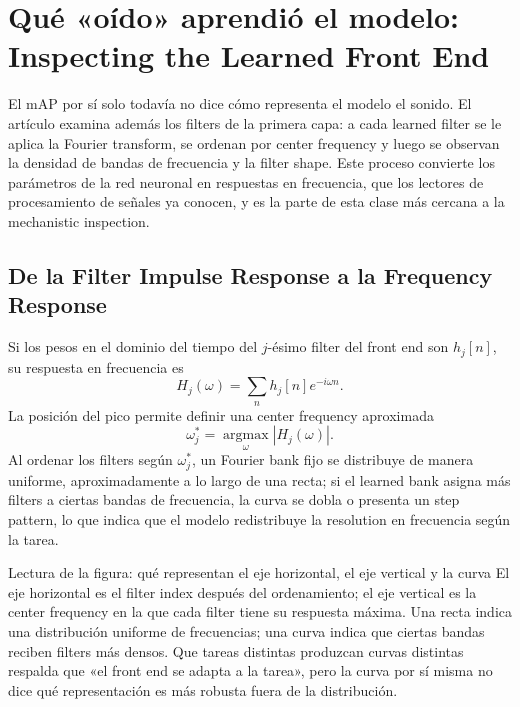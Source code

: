 \section{Qué «oído» aprendió el modelo: Inspecting the Learned Front End}

El mAP por sí solo todavía no dice cómo representa el modelo el sonido. El artículo examina además los filters de la primera capa: a cada learned filter se le aplica la Fourier transform, se ordenan por center frequency y luego se observan la densidad de bandas de frecuencia y la filter shape. Este proceso convierte los parámetros de la red neuronal en respuestas en frecuencia, que los lectores de procesamiento de señales ya conocen, y es la parte de esta clase más cercana a la mechanistic inspection.

\subsection{De la Filter Impulse Response a la Frequency Response}

Si los pesos en el dominio del tiempo del $j$-ésimo filter del front end son $h_j[n]$, su respuesta en frecuencia es
\[
H_j(\omega)=\sum_n h_j[n]e^{-i\omega n}.
\]
La posición del pico permite definir una center frequency aproximada
\[
\omega_j^*=\operatorname*{argmax}_{\omega}|H_j(\omega)|.
\]
Al ordenar los filters según $\omega_j^*$, un Fourier bank fijo se distribuye de manera uniforme, aproximadamente a lo largo de una recta; si el learned bank asigna más filters a ciertas bandas de frecuencia, la curva se dobla o presenta un step pattern, lo que indica que el modelo redistribuye la resolution en frecuencia según la tarea.


\begin{knowledgebox}{Lectura de la figura: qué representan el eje horizontal, el eje vertical y la curva}
El eje horizontal es el filter index después del ordenamiento; el eje vertical es la center frequency en la que cada filter tiene su respuesta máxima. Una recta indica una distribución uniforme de frecuencias; una curva indica que ciertas bandas reciben filters más densos. Que tareas distintas produzcan curvas distintas respalda que «el front end se adapta a la tarea», pero la curva por sí misma no dice qué representación es más robusta fuera de la distribución.
\end{knowledgebox}

